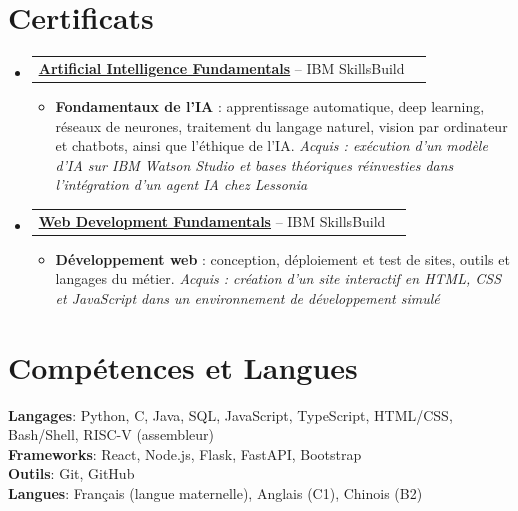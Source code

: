 \documentclass[letterpaper,11pt]{article}
\makeatletter
\newcommand{\resumeItem}[1]{
  \item\small{
    {#1 \vspace{-2pt}}
  }
}
\newcommand{\resumeProjectHeading}[2]{
    \item
    \begin{tabular*}{0.97\textwidth}{l@{\extracolsep{\fill}}r}
      \small#1 & #2 \\
    \end{tabular*}\vspace{-7pt}
}
\newcommand{\resumeSubHeadingListStart}{\begin{itemize}[leftmargin=0.15in, label={}]}
\newcommand{\resumeSubHeadingListEnd}{\end{itemize}}
\newcommand{\resumeItemListStart}{\begin{itemize}}
\newcommand{\resumeItemListEnd}{\end{itemize}\vspace{-5pt}}
\makeatother
\begin{document}
\section{Certificats}
    \resumeSubHeadingListStart
      \resumeProjectHeading
          {\textbf{\href{https://www.credly.com/badges/942aa2ea-c60e-4343-9da9-fcaad618f717/public_url}{\underline{Artificial Intelligence Fundamentals}}} -- IBM SkillsBuild}{}
          \resumeItemListStart
            \resumeItem{\textbf{Fondamentaux de l'IA} : apprentissage automatique, deep learning, réseaux de neurones, traitement du langage naturel, vision par ordinateur et chatbots, ainsi que l'éthique de l'IA. \textit{Acquis : exécution d'un modèle d'IA sur IBM Watson Studio et bases théoriques réinvesties dans l'intégration d'un agent IA chez Lessonia}}
          \resumeItemListEnd
      \resumeProjectHeading
          {\textbf{\href{https://www.credly.com/badges/f42f2621-21d8-478a-9dae-b04f33677714/public_url}{\underline{Web Development Fundamentals}}} -- IBM SkillsBuild}{}
          \resumeItemListStart
            \resumeItem{\textbf{Développement web} : conception, déploiement et test de sites, outils et langages du métier. \textit{Acquis : création d'un site interactif en HTML, CSS et JavaScript dans un environnement de développement simulé}}
          \resumeItemListEnd
    \resumeSubHeadingListEnd



%
\section{Compétences et Langues}
 \begin{itemize}[leftmargin=0.15in, label={}]
    \small{\item{
     \textbf{Langages}{: Python, C, Java, SQL, JavaScript, TypeScript, HTML/CSS, Bash/Shell, RISC-V (assembleur)} \\
     \textbf{Frameworks}{: React, Node.js, Flask, FastAPI, Bootstrap} \\
     \textbf{Outils}{: Git, GitHub} \\
     \textbf{Langues}{: Français (langue maternelle), Anglais (C1), Chinois (B2)}
    }}
 \end{itemize}


\end{document}
